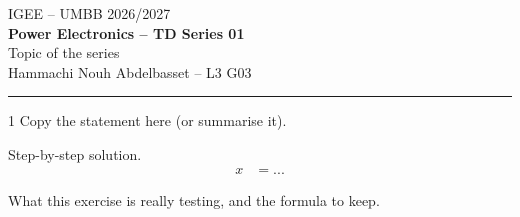 \documentclass[11pt,a4paper]{article}
\newcommand{\course}{Power Electronics}
\newcommand{\series}{01}
\newcommand{\topic}{Topic of the series}
\newcommand{\studentname}{Hammachi Nouh Abdelbasset -- L3 G03}
\begin{document}
\begin{center}
{\large IGEE -- UMBB \hfill 2026/2027}\\[6pt]
{\LARGE\bfseries \course{} -- TD Series \series}\\[4pt]
{\large \topic}\\[4pt]
{\small \studentname}
\end{center}
\hrule\bigskip

\begin{exercise}{1}
Copy the statement here (or summarise it).
\end{exercise}
\begin{solution}
Step-by-step solution.
\begin{align*}
x &= ...
\end{align*}
\end{solution}
\begin{keyidea}
What this exercise is really testing, and the formula to keep.
\end{keyidea}
\end{document}
